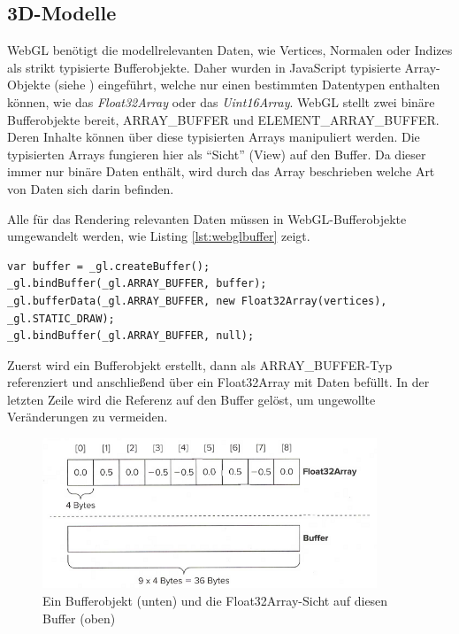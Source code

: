 \subsection{3D-Modelle}
WebGL benötigt die modellrelevanten Daten, wie Vertices, Normalen oder Indizes als strikt typisierte Bufferobjekte. Daher wurden in JavaScript typisierte Array-Objekte (siehe \autocite{TypedArrays}) eingeführt, welche nur einen bestimmten Datentypen enthalten können, wie das \textit{Float32Array} oder das \textit{Uint16Array}. WebGL stellt zwei binäre Bufferobjekte bereit, AR\-RAY\-\_BUF\-FER und EL\-E\-MENT\-\_AR\-RAY\-\_BUF\-FER. Deren Inhalte können über diese typisierten Arrays manipuliert werden. Die typisierten Arrays fungieren hier als "`Sicht"' (View) auf den Buffer. Da dieser immer nur binäre Daten enthält, wird durch das Array beschrieben welche Art von Daten sich darin befinden.

Alle für das Rendering relevanten Daten müssen in WebGL-Bufferobjekte umgewandelt werden, wie Listing \ref{lst:webglbuffer} zeigt.
\lstset{language=JavaScript}
\begin{lstlisting}[caption={Erstellen eines WebGL-Buffers und Anbinden der Daten}, label={lst:webglbuffer}]
var buffer = _gl.createBuffer();
_gl.bindBuffer(_gl.ARRAY_BUFFER, buffer);
_gl.bufferData(_gl.ARRAY_BUFFER, new Float32Array(vertices), _gl.STATIC_DRAW);
_gl.bindBuffer(_gl.ARRAY_BUFFER, null);
\end{lstlisting}
Zuerst wird ein Bufferobjekt erstellt, dann als ARRAY\-\_BUFFER-Typ referenziert und anschließend über ein Float32Array mit Daten befüllt. In der letzten Zeile wird die Referenz auf den Buffer gelöst, um ungewollte Veränderungen zu vermeiden.
\begin{figure}
\centering
\includegraphics[width=100mm]{bilder/vbo.png}
\caption{Ein Bufferobjekt (unten) und die Float32Array-Sicht auf diesen Buffer (oben) \autocite{WebGlPogramming}}
\label{fig:vbo}
\end{figure}

